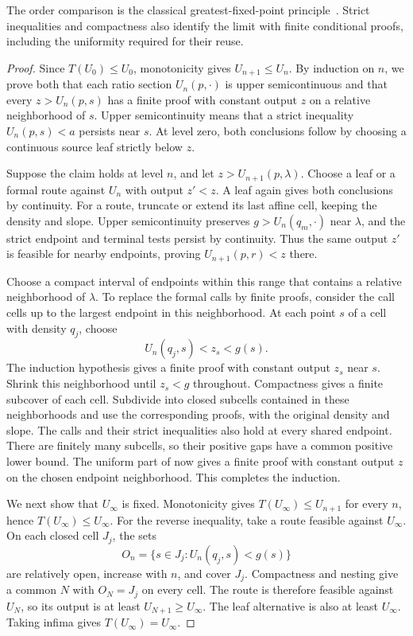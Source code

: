 \documentclass[11pt]{article}
\theoremstyle{definition}
\begin{document}
The order comparison is the classical greatest-fixed-point principle~\cite[Theorem~1]{Tarski}.
Strict inequalities and compactness also identify the limit with finite conditional proofs, including the uniformity required for their reuse.

\begin{proof}
Since $T(U_0)\le U_0$, monotonicity gives $U_{n+1}\le U_n$.
By induction on $n$, we prove both that each ratio section $U_n(p,\cdot)$ is upper semicontinuous and that every $z>U_n(p,s)$ has a finite proof with constant output $z$ on a relative neighborhood of $s$.
Upper semicontinuity means that a strict inequality $U_n(p,s)<a$ persists near $s$.
At level zero, both conclusions follow by choosing a continuous source leaf strictly below $z$.

Suppose the claim holds at level $n$, and let $z>U_{n+1}(p,\lambda)$.
Choose a leaf or a formal route against $U_n$ with output $z'<z$.
A leaf again gives both conclusions by continuity.
For a route, truncate or extend its last affine cell, keeping the density and slope.
Upper semicontinuity preserves $g>U_n(q_m,\cdot)$ near $\lambda$, and the strict endpoint and terminal tests persist by continuity.
Thus the same output $z'$ is feasible for nearby endpoints, proving $U_{n+1}(p,r)<z$ there.

Choose a compact interval of endpoints within this range that contains a relative neighborhood of $\lambda$.
To replace the formal calls by finite proofs, consider the call cells up to the largest endpoint in this neighborhood.
At each point $s$ of a cell with density $q_j$, choose
\[
 U_n(q_j,s)<z_s<g(s).
\]
The induction hypothesis gives a finite proof with constant output $z_s$ near $s$.
Shrink this neighborhood until $z_s<g$ throughout.
Compactness gives a finite subcover of each cell.
Subdivide into closed subcells contained in these neighborhoods and use the corresponding proofs, with the original density and slope.
The calls and their strict inequalities also hold at every shared endpoint.
There are finitely many subcells, so their positive gaps have a common positive lower bound.
The uniform part of  now gives a finite proof with constant output $z$ on the chosen endpoint neighborhood.
This completes the induction.

We next show that $U_\infty$ is fixed.
Monotonicity gives $T(U_\infty)\le U_{n+1}$ for every $n$, hence $T(U_\infty)\le U_\infty$.
For the reverse inequality, take a route feasible against $U_\infty$.
On each closed cell $J_j$, the sets
\[
 O_n=\{s\in J_j:U_n(q_j,s)<g(s)\}
\]
are relatively open, increase with $n$, and cover $J_j$.
Compactness and nesting give a common $N$ with $O_N=J_j$ on every cell.
The route is therefore feasible against $U_N$, so its output is at least $U_{N+1}\ge U_\infty$.
The leaf alternative is also at least $U_\infty$.
Taking infima gives $T(U_\infty)=U_\infty$.


\end{proof}
\end{document}
